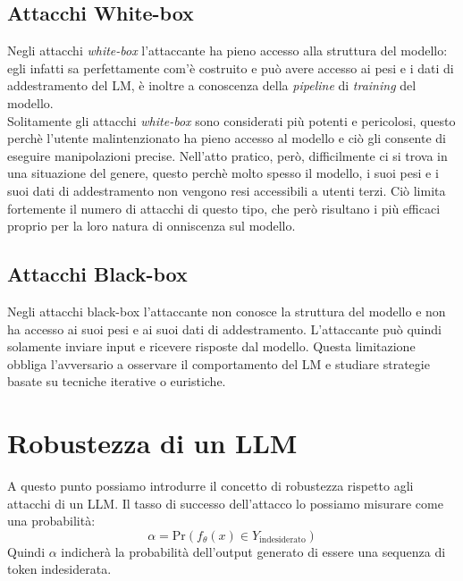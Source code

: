\subsection{Attacchi White-box}
Negli attacchi \emph{white-box} l'attaccante ha pieno accesso alla struttura del modello: egli infatti sa perfettamente com'\`e costruito e pu\`o avere accesso ai pesi e i dati di addestramento del LM, \`e inoltre a conoscenza della \emph{pipeline} di \emph{training} del modello.\\
Solitamente gli attacchi \emph{white-box} sono considerati pi\`u potenti e pericolosi, questo perch\`e l'utente malintenzionato ha pieno accesso al modello e ci\`o gli consente di eseguire manipolazioni precise. Nell'atto pratico, per\`o, difficilmente ci si trova in una situazione del genere, questo perch\`e molto spesso il modello, i suoi pesi e i suoi dati di addestramento non vengono resi accessibili a utenti terzi. Ci\`o limita fortemente il numero di attacchi di questo tipo, che per\`o risultano i pi\`u efficaci proprio per la loro natura di onniscenza sul modello.

\subsection{Attacchi Black-box}
Negli attacchi black-box l'attaccante non conosce la struttura del modello e non ha accesso ai suoi pesi e ai suoi dati di addestramento. 
L'attaccante pu\`o quindi solamente inviare input e ricevere risposte dal modello. Questa limitazione obbliga l'avversario a osservare il comportamento del LM e studiare strategie basate su tecniche iterative o euristiche.

\section{Robustezza di un LLM}
A questo punto possiamo introdurre il concetto di robustezza rispetto agli attacchi di un LLM. Il tasso di successo dell'attacco lo possiamo misurare come una probabilit\`a:
\[\alpha = \text{Pr}(f_\theta(x) \in Y_\text{indesiderato})\]
Quindi \(\alpha\) indicher\`a la probabilit\`a dell'output generato di essere una sequenza di token indesiderata.

